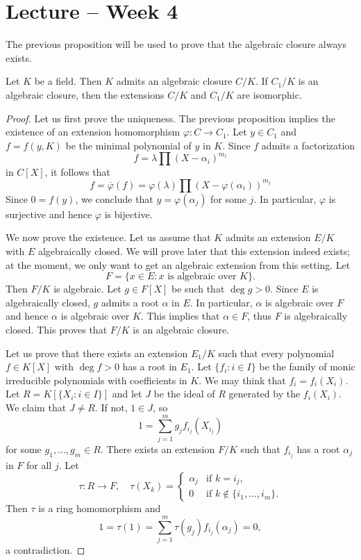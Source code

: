 \section{Lecture -- Week 4}

The previous proposition will be used to prove 
that the algebraic closure always exists. 

\begin{theorem}[Artin]
	Let $K$ be a field. Then $K$ admits an algebraic closure $C/K$. If $C_1/K$
	is an algebraic closure, then the extensions $C/K$ and $C_1/K$ are
	isomorphic. 
\end{theorem}

\begin{proof}
    Let us first prove the uniqueness. The previous proposition implies the existence of 
    an extension homomorphism $\varphi\colon C\to C_1$. Let $y\in C_1$ and $f=f(y,K)$ be 
    the minimal polynomial of $y$ in $K$. Since $f$ admits a factorization
    \[
        f=\lambda\prod (X-\alpha_i)^{m_i}
    \]
    in $C[X]$, it follows that
    \[
    f=\overline{\varphi}(f)=\varphi(\lambda)\prod (X-\varphi(\alpha_i))^{m_i}
    \]
    Since $0=f(y)$, we conclude that $y=\varphi(\alpha_j)$ for some $j$. In particular, $\varphi$ is
    surjective and hence $\varphi$ is bijective. 
    
    We now prove the existence. Let us assume that $K$ admits an extension $E/K$ 
    with $E$ algebraically closed. We will prove later that this extension indeed exists; at the moment,
    we only want to get an algebraic extension from this setting. Let 
    \[
    	F=\{x\in E:x\text{ is algebraic over }K\}. 
    \]
    Then $F/K$ is algebraic. Let $g\in F[X]$ be such that
    $\deg g>0$. Since $E$ is algebraically closed, $g$ admits a root $\alpha$ in $E$. In particular, $\alpha$
    is algebraic over $F$ and hence $\alpha$ is algebraic over $K$. This implies that $\alpha\in F$, thus
    $F$ is algebraically closed. This proves that $F/K$ is an algebraic closure. 
    
    Let us prove that there exists an extension $E_1/K$ such that
    every polynomial $f\in K[X]$ with $\deg f>0$ has a root in $E_1$. Let 
    $\{f_i:i\in I\}$ be the family of monic irreducible polynomials with coefficients in $K$. 
    We may think that $f_i=f_i(X_i)$. 
    Let $R=K[\{X_i:i\in I\}]$ and let $J$ be the ideal of $R$ 
    generated by the $f_i(X_i)$. We claim that $J\ne R$. If not, $1\in J$, so
    \[
    1=\sum_{j=1}^m g_jf_{i_j}(X_{i_j})
    \]
    for some $g_1,\dots,g_m\in R$. There exists an extension $F/K$ such that
    $f_{i_j}$ has a root $\alpha_j$ in $F$ for all $j$. Let 
    \[
    \tau\colon R\to F,\quad
    \tau(X_k)=\begin{cases}
        \alpha_j & \text{if $k=i_j$},\\
        0 & \text{if $k\not\in\{i_1,\dots,i_m\}$}.
        \end{cases}
    \]
    Then $\tau$ is a ring homomorphism and 
    \[
    1=\tau(1)=\sum_{j=1}^m\tau(g_j)f_{i_j}(\alpha_{j})=0,
    \]
    a contradiction. 
    

\end{proof}
